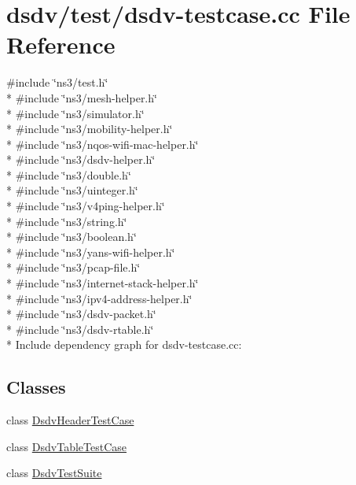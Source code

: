 \hypertarget{dsdv-testcase_8cc}{}\section{dsdv/test/dsdv-\/testcase.cc File Reference}
\label{dsdv-testcase_8cc}
{\ttfamily \#include \char`\"{}ns3/test.\+h\char`\"{}}\\*
{\ttfamily \#include \char`\"{}ns3/mesh-\/helper.\+h\char`\"{}}\\*
{\ttfamily \#include \char`\"{}ns3/simulator.\+h\char`\"{}}\\*
{\ttfamily \#include \char`\"{}ns3/mobility-\/helper.\+h\char`\"{}}\\*
{\ttfamily \#include \char`\"{}ns3/nqos-\/wifi-\/mac-\/helper.\+h\char`\"{}}\\*
{\ttfamily \#include \char`\"{}ns3/dsdv-\/helper.\+h\char`\"{}}\\*
{\ttfamily \#include \char`\"{}ns3/double.\+h\char`\"{}}\\*
{\ttfamily \#include \char`\"{}ns3/uinteger.\+h\char`\"{}}\\*
{\ttfamily \#include \char`\"{}ns3/v4ping-\/helper.\+h\char`\"{}}\\*
{\ttfamily \#include \char`\"{}ns3/string.\+h\char`\"{}}\\*
{\ttfamily \#include \char`\"{}ns3/boolean.\+h\char`\"{}}\\*
{\ttfamily \#include \char`\"{}ns3/yans-\/wifi-\/helper.\+h\char`\"{}}\\*
{\ttfamily \#include \char`\"{}ns3/pcap-\/file.\+h\char`\"{}}\\*
{\ttfamily \#include \char`\"{}ns3/internet-\/stack-\/helper.\+h\char`\"{}}\\*
{\ttfamily \#include \char`\"{}ns3/ipv4-\/address-\/helper.\+h\char`\"{}}\\*
{\ttfamily \#include \char`\"{}ns3/dsdv-\/packet.\+h\char`\"{}}\\*
{\ttfamily \#include \char`\"{}ns3/dsdv-\/rtable.\+h\char`\"{}}\\*
Include dependency graph for dsdv-\/testcase.cc\+:
\subsection*{Classes}
\begin{DoxyCompactItemize}
\item 
class \hyperlink{classDsdvHeaderTestCase}{Dsdv\+Header\+Test\+Case}
\item 
class \hyperlink{classDsdvTableTestCase}{Dsdv\+Table\+Test\+Case}
\item 
class \hyperlink{classDsdvTestSuite}{Dsdv\+Test\+Suite}
\end{DoxyCompactItemize}
